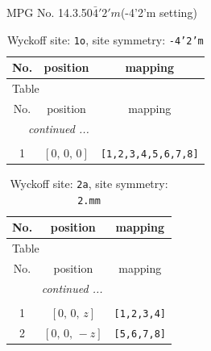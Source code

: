 \documentclass[fleqn,8pt]{jsarticle}
\begin{document}
\setcounter{MaxMatrixCols}{32}

\renewcommand{\tablename}{Table~}
\renewcommand{\figurename}{Figure~}
\begin{center}
\LARGE
MPG No. 14.3.50\quad$\bar{4}'2'm$\quad(-4'2'm setting)
\end{center}
\renewcommand{\arraystretch}{1.2}
\begin{longtable}{ccc}
\caption{Wyckoff site: {\tt 1o}, site symmetry: {\tt -4'2'm}}
 \\
 \hline \hline
No. & position & mapping \\ \hline \endfirsthead

\multicolumn{2}{l}{\tablename\ \thetable{}} \\
 \hline \hline
No. & position & mapping \\ \hline \endhead

 \hline \hline
\multicolumn{2}{r}{\footnotesize\it continued ...} \\ \endfoot

 \hline \hline
\multicolumn{2}{r}{} \\ \endlastfoot

1 & $\left[ 0,\, 0,\, 0 \right]$ & {\tt [1,2,3,4,5,6,7,8]} \\
\end{longtable}
\renewcommand{\arraystretch}{1.2}
\begin{longtable}{ccc}
\caption{Wyckoff site: {\tt 2a}, site symmetry: {\tt 2.mm}}
 \\
 \hline \hline
No. & position & mapping \\ \hline \endfirsthead

\multicolumn{2}{l}{\tablename\ \thetable{}} \\
 \hline \hline
No. & position & mapping \\ \hline \endhead

 \hline \hline
\multicolumn{2}{r}{\footnotesize\it continued ...} \\ \endfoot

 \hline \hline
\multicolumn{2}{r}{} \\ \endlastfoot

1 & $\left[ 0,\, 0,\, z \right]$ & {\tt [1,2,3,4]} \\ \hline
2 & $\left[ 0,\, 0,\, - z \right]$ & {\tt [5,6,7,8]} \\
\end{longtable}
\renewcommand{\arraystretch}{1.2}
\end{document}
